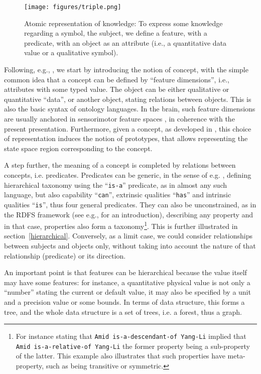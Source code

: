 \documentclass[sn-mathphys]{sn-jnl}
\begin{document}
\begin{figure}[htbp]
\centerline{\texttt{[image: figures/triple.png]}}
\caption{Atomic representation of knowledge: To express some knowledge regarding a symbol, the subject, we define a feature, with a predicate, with an object as an attribute (i.e., a quantitative data value or a qualitative symbol).}
\label{triple}
\end{figure}

Following, e.g., \cite{gardenfors_conceptual_2004}, we start by introducing the notion of concept, with the simple common idea that a concept can be defined by ``feature dimensions'', i.e., attributes with some typed value. The object can be either qualitative or quantitative ``data'', or another object, stating relations between objects. This is also the basic syntax of ontology languages. In the brain, such feature dimensions are usually anchored in sensorimotor feature spaces \cite{freksa_strong_2015}, in coherence with the present presentation. Furthermore, given a concept, as developed in \cite{gardenfors_conceptual_2004}, this choice of representation induces the notion of prototypes, that allows representing the state space region corresponding to the concept.

A step further, the meaning of a concept is completed by relations between concepts, i.e. predicates. Predicates can be generic, in the sense of e.g. \cite{mcclelland_parallel_2003}, defining hierarchical taxonomy using the ``{\tt is-a}'' predicate, as in almost any such language, but also capability ``{\tt can}'', extrinsic qualities ``{\tt has}'' and intrinsic qualities ``{\tt is}'', thus four general predicates. They can also be unconstrained, as in the RDFS framework (see e.g., \cite{noy_ontology_2001} for an introduction), describing any property and in that case, properties also form a taxonomy\footnote{For instance stating that {\tt Amid is-a-descendant-of Yang-Li} implied that {\tt Amid is-a-relative-of Yang-Li} the former property being a sub-property of the latter. This example also illustrates that such properties have meta-property, such as being transitive or symmetric.}. This is further illustrated in section~\ref{hierarchical}. Conversely, as a limit case, we could consider relationships between subjects and objects only, without taking into account the nature of that relationship (predicate) or its direction.

An important point is that features can be hierarchical because the value itself may have some features: for instance, a quantitative physical value is not only a ``number'' stating the current or default value, it may also be specified by a unit and a precision value or some bounds. In terms of data structure, this forms a tree, and the whole data structure is a set of trees, i.e. a forest, thus a graph.
\end{document}
